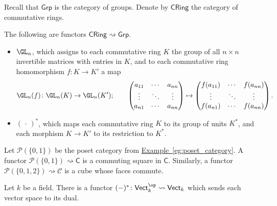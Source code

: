 \documentclass[main.tex]{subfiles}
\begin{document}
\begin{example}
  \label{eg:twofunctorsgrptocring}
  Recall that $\mathsf{Grp}$ is the category of groups. Denote by $\mathsf{CRing}$ the category of commutative rings.

  The following are functors $\mathsf{CRing} \rightsquigarrow \mathsf{Grp}$.
  \begin{itemize}
    \item $\GL_{n}$, which assigns to each commutative ring $K$ the group of all $n \times n$ invertible matrices with entries in $K$, and to each commutative ring homomorphism $f\colon K \to K'$ a map
      \begin{equation*}
        \GL_{n}(f)\colon \GL_{n}(K) \to \GL_{n}(K');\qquad
        \begin{pmatrix}
          a_{11} & \cdots & a_{nn} \\
          \vdots & \ddots & \vdots \\
          a_{n1} & \cdots & a_{nn}
        \end{pmatrix}
        \mapsto
        \begin{pmatrix}
          f(a_{11}) & \cdots & f(a_{nn}) \\
          \vdots & \ddots & \vdots \\
          f(a_{n1}) & \cdots & f(a_{nn})
        \end{pmatrix}.
      \end{equation*}

    \item ${(\,\cdot\,)}^{*}$, which maps each commutative ring $K$ to its group of units $K^{*}$, and each morphism $K \to K'$ to its restriction to $K^{*}$.
  \end{itemize}
\end{example}

\begin{example}
  Let $\mathcal{P}(\{0, 1\})$ be the poset category from \hyperref[eg:poset_category]{Example~\ref*{eg:poset_category}}. A functor $\mathcal{P}(\{0, 1\}) \rightsquigarrow \mathsf{C}$ is a commuting square in $\mathsf{C}$. Similarly, a functor $\mathcal{P}(\{0, 1, 2\}) \rightsquigarrow \mathcal{C}$ is a cube whose faces commute.
\end{example}

\begin{example}
  Let $k$ be a field. There is a functor $(-)^{*}\colon \mathsf{Vect}_{k}^{\op} \rightsquigarrow \mathsf{Vect}_{k}$ which sends each vector space to its dual.
\end{example}
\end{document}
